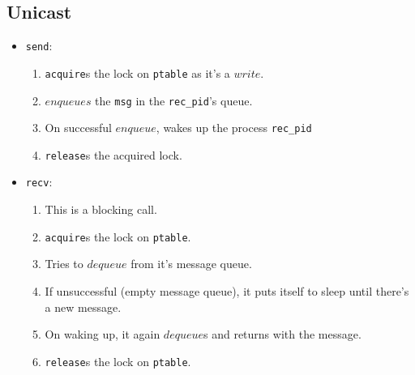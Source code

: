 \documentclass[12pt]{article}
\begin{document}
\subsection{Unicast}
\begin{itemize}
    \item \texttt{send}:
        \begin{enumerate}
            \item \texttt{acquire}s the lock on \texttt{ptable} as it's a $write$.
            \item $enqueues$ the \texttt{msg} in the \texttt{rec\_pid}'s queue.
            \item On successful $enqueue$, wakes up the process \texttt{rec\_pid}
            \item \texttt{release}s the acquired lock.
        \end{enumerate}
    \item \texttt{recv}:
        \begin{enumerate}
            \item This is a blocking call.
            \item \texttt{acquire}s the lock on \texttt{ptable}.
            \item Tries to $dequeue$ from it's message queue.
            \item If unsuccessful (empty message queue), it puts itself to sleep
                until there's a new message.
            \item On waking up, it again $dequeue$s and returns with the message.
            \item \texttt{release}s the lock on \texttt{ptable}.
        \end{enumerate}
\end{itemize}


\end{document}
